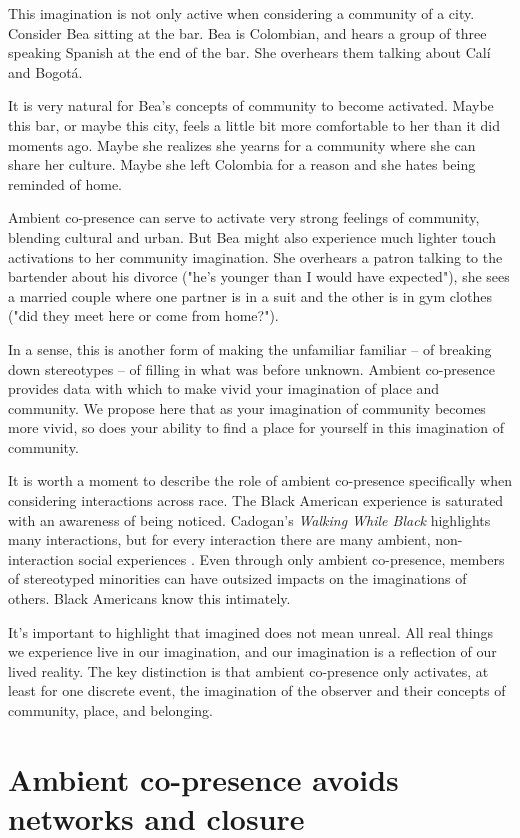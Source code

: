 \documentclass[12pt]{article}
\begin{document}
This imagination is not only active when considering a community of a city. Consider Bea sitting at the bar. Bea is Colombian, and hears a group of three speaking Spanish at the end of the bar. She overhears them talking about Calí and Bogotá. 

It is very natural for Bea's concepts of community to become activated. Maybe this bar, or maybe this city, feels a little bit more comfortable to her than it did moments ago. Maybe she realizes she yearns for a community where she can share her culture. Maybe she left Colombia for a reason and she hates being reminded of home.

Ambient co-presence can serve to activate very strong feelings of community, blending cultural and urban. But Bea might also experience much lighter touch activations to her community imagination. She overhears a patron talking to the bartender about his divorce ("he's younger than I would have expected"), she sees a married couple where one partner is in a suit and the other is in gym clothes ("did they meet here or come from home?").

In a sense, this is another form of making the unfamiliar familiar -- of breaking down stereotypes -- of filling in what was before unknown. Ambient co-presence provides data with which to make vivid your imagination of place and community. We propose here that as your imagination of community becomes more vivid, so does your ability to find a place for yourself in this imagination of community.

It is worth a moment to describe the role of ambient co-presence specifically when considering interactions across race. The Black American experience is saturated with an awareness of being noticed. Cadogan's \textit{Walking While Black} highlights many interactions, but for every interaction there are many ambient, non-interaction social experiences \citep{cadogan2016}. Even through only ambient co-presence, members of stereotyped minorities can have outsized impacts on the imaginations of others. Black Americans know this intimately.

It's important to highlight that imagined does not mean unreal. All real things we experience live in our imagination, and our imagination is a reflection of our lived reality. The key distinction is that ambient co-presence only activates, at least for one discrete event, the imagination of the observer and their concepts of community, place, and belonging. 

\section{Ambient co-presence avoids networks and closure}
\end{document}
